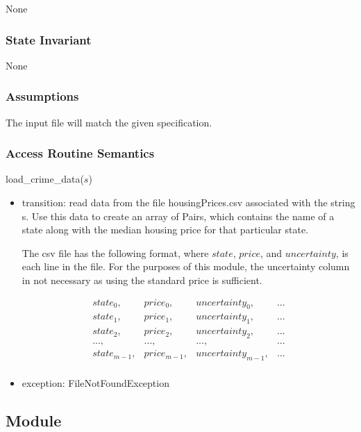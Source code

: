 \documentclass[12pt]{article}
\begin{document}
None

\subsubsection* {State Invariant}

None

\subsubsection* {Assumptions}

The input file will match the given specification.

\subsubsection* {Access Routine Semantics}

\noindent load\_crime\_data($s$)
\begin{itemize}
\item transition: read data from the file housingPrices.csv associated with the string s.
  Use this data to create an array of Pairs, which contains the name of a state along with
  the median housing price for that particular state.

  The csv file has the following format, where $state$, $price$, and $uncertainty$, is each line in the file. For the purposes of this module, the uncertainty column in not necessary as using the standard price is sufficient.

  \begin{equation}
    \begin{array}{cccc}
      state_0, & price_0, & uncertainty_0, & . . . \\
      state_1, & price_1, & uncertainty_1, & . . . \\
      state_2, & price_2, & uncertainty_2, & . . . 
      \\
      ..., & ..., & ..., & ...
      \\
      state_{m-1}, & price_{m-1}, & uncertainty_{m-1}, & . . . \\
    \end{array}
  \end{equation}

\item exception: FileNotFoundException
\end{itemize}
\newpage

\subsection*{Module}
\end{document}

